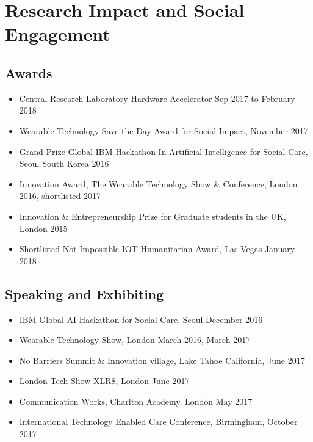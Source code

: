 \chapter{Research Impact and Social Engagement}
\section{Awards}
\begin{itemize}
    \item Central Research Laboratory Hardware Accelerator Sep 2017 to February 2018 
    \item Wearable Technology Save the Day Award for Social Impact, November 2017
    \item Grand Prize Global IBM Hackathon In Artificial Intelligence for Social Care, Seoul South Korea 2016
    \item Innovation Award, The Wearable Technology Show \& Conference, London 2016, shortlisted 2017
    \item Innovation \& Entrepreneurship Prize for Graduate students in the UK, London 2015 
    \item Shortlisted Not Impossible IOT Humanitarian Award, Las Vegas January 2018
\end{itemize}

\section{Speaking and Exhibiting}
\begin{itemize}
    \item IBM Global AI Hackathon for Social Care, Seoul December 2016
    \item Wearable Technology Show, London March 2016, March 2017
    \item No Barriers Summit \& Innovation village, Lake Tahoe California, June 2017
    \item London Tech Show XLR8, London June 2017
    \item Communication Works, Charlton Academy, London May 2017
    \item International Technology Enabled Care Conference, Birmingham, October 2017 
\end{itemize}


